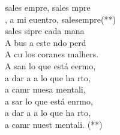 \begin{cancion}%
	 sales empre, sales mpre\\
	, a mi euentro, salesempre(**)\\
\jump
	sales sipre cada mana\\
	A bus a este ndo perd\\
	A cu los coranes malhers.\\
	A san lo que está eermo,\\
	a dar a a lo que ha rto,\\
	a camr nuesa mentali,\\
	a sar lo que está enrmo,\\
	a dar a a lo que ha rto,\\
	a camr nuest mentali. (**)\\
\end{cancion}%
